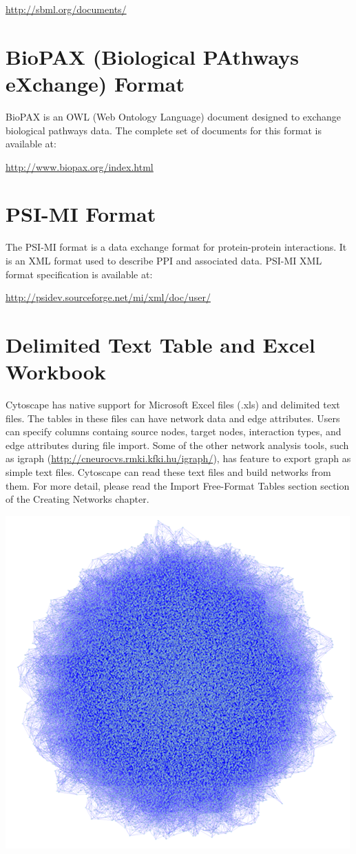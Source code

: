  \url{http://sbml.org/documents/}


 
\section{BioPAX (Biological PAthways eXchange) Format}


 BioPAX is an OWL (Web Ontology Language) document designed to exchange biological pathways data. The complete set of documents for this format is available at: 


 \url{http://www.biopax.org/index.html}


 
\section{PSI-MI Format}


 The PSI-MI format is a data exchange format for protein-protein interactions. It is an XML format used to describe PPI and associated data. PSI-MI XML format specification is available at: 


 \url{http://psidev.sourceforge.net/mi/xml/doc/user/}


 
\section{Delimited Text Table and Excel Workbook}


 Cytoscape has native support for Microsoft Excel files (.xls) and delimited text files. The tables in these files can have network data and edge attributes. Users can specify columns containg source nodes, target nodes, interaction types, and edge attributes during file import. Some of the other network analysis tools, such as igraph (\url{http://cneurocvs.rmki.kfki.hu/igraph/}), has feature to export graph as simple text files. Cytoscape can read these text files and build networks from them. For more detail, please read the Import Free-Format Tables section section of the Creating Networks chapter. 

\centerline{\includegraphics[width=.7\textwidth]{images/huge_network_igraph.png}}

